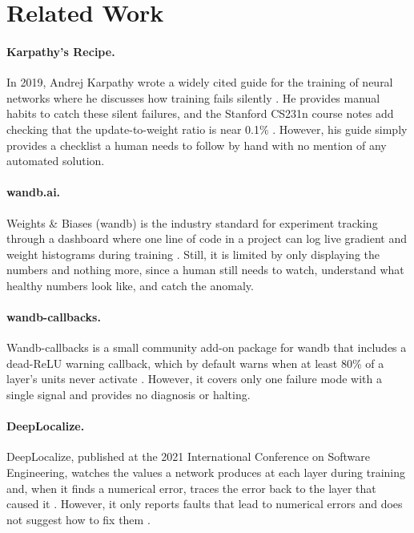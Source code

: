 \section{Related Work}

\paragraph{Karpathy's Recipe.} In 2019, Andrej Karpathy wrote a widely cited guide for the training of neural networks where he discusses how training fails silently \citep{karpathy2019}. He provides manual habits to catch these silent failures, and the Stanford CS231n course notes add checking that the update-to-weight ratio is near 0.1\% \citep{cs231n}. However, his guide simply provides a checklist a human needs to follow by hand with no mention of any automated solution.

\paragraph{wandb.ai.} Weights \& Biases (wandb) is the industry standard for experiment tracking through a dashboard where one line of code in a project can log live gradient and weight histograms during training \citep{biewald2020}. Still, it is limited by only displaying the numbers and nothing more, since a human still needs to watch, understand what healthy numbers look like, and catch the anomaly.

\paragraph{wandb-callbacks.} Wandb-callbacks is a small community add-on package for wandb that includes a dead-ReLU warning callback, which by default warns when at least 80\% of a layer's units never activate \citep{groeger_wandbcallbacks}. However, it covers only one failure mode with a single signal and provides no diagnosis or halting.

\paragraph{DeepLocalize.} DeepLocalize, published at the 2021 International Conference on Software Engineering, watches the values a network produces at each layer during training and, when it finds a numerical error, traces the error back to the layer that caused it \citep{wardat2021}. However, it only reports faults that lead to numerical errors and does not suggest how to fix them \citep{wardat2022}.

